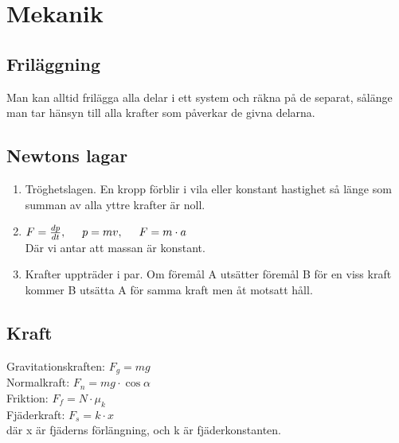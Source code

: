 \section{Mekanik}

\subsection{Friläggning}
Man kan alltid frilägga alla delar i ett system och räkna på de separat, sålänge man tar hänsyn till alla krafter som påverkar de givna delarna.

\subsection{Newtons lagar}
\begin{enumerate}
    \item
        Tröghetslagen. En kropp förblir i vila eller konstant hastighet så länge som summan av alla yttre krafter är noll.
    \item
        \begin{math}
            F = \frac{dp}{dt}, \hspace*{0.5cm} p = mv, \hspace*{0.5cm} F = m \cdot a
        \end{math} \\[2pt]
        Där vi antar att massan är konstant.
    \item
        Krafter uppträder i par. Om föremål A utsätter föremål B för en viss kraft kommer B utsätta A för samma kraft men åt motsatt håll.
\end{enumerate}

\subsection{Kraft}
Gravitationskraften: 
\begin{math}
    F_g = mg
\end{math} \\[2pt]
Normalkraft:
\begin{math}
    F_n = mg \cdot \cos \alpha
\end{math} \\[2pt]
Friktion:
\begin{math}
    F_f = N \cdot \mu_k
\end{math} \\[2pt]
Fjäderkraft:
\begin{math}
    F_s = k \cdot x
\end{math} \\[2pt]
där x är fjäderns förlängning, och k är fjäderkonstanten.

